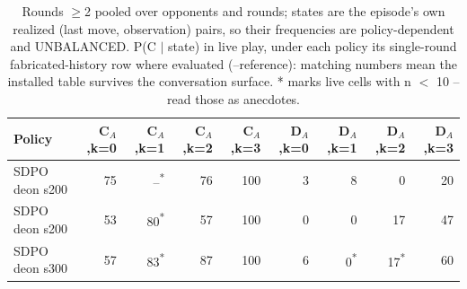 \begin{table}[t]
\centering
\caption{Rounds $\geq$2 pooled over opponents and rounds; states are the episode's own realized (last move, observation) pairs, so their frequencies are policy-dependent and UNBALANCED. P(C $\mid$ state) in live play, under each policy its single-round fabricated-history row where evaluated (--reference): matching numbers mean the installed table survives the conversation surface. * marks live cells with n $<$ 10 -- read those as anecdotes.}
\label{tab:mr-live-states}
\small
\setlength{\tabcolsep}{3.5pt}
\begin{tabular}{lrrrrrrrr}
\toprule
Policy & C$_A$,k=0 & C$_A$,k=1 & C$_A$,k=2 & C$_A$,k=3 & D$_A$,k=0 & D$_A$,k=1 & D$_A$,k=2 & D$_A$,k=3 \\
\midrule
SDPO deon s200 & 75 & --\textsuperscript{*} & 76 & 100 & 3 & 8 & 0 & 20 \\
SDPO deon s200 & 53 & 80\textsuperscript{*} & 57 & 100 & 0 & 0 & 17 & 47 \\
SDPO deon s300 & 57 & 83\textsuperscript{*} & 87 & 100 & 6 & 0\textsuperscript{*} & 17\textsuperscript{*} & 60 \\
\bottomrule
\end{tabular}
\end{table}

